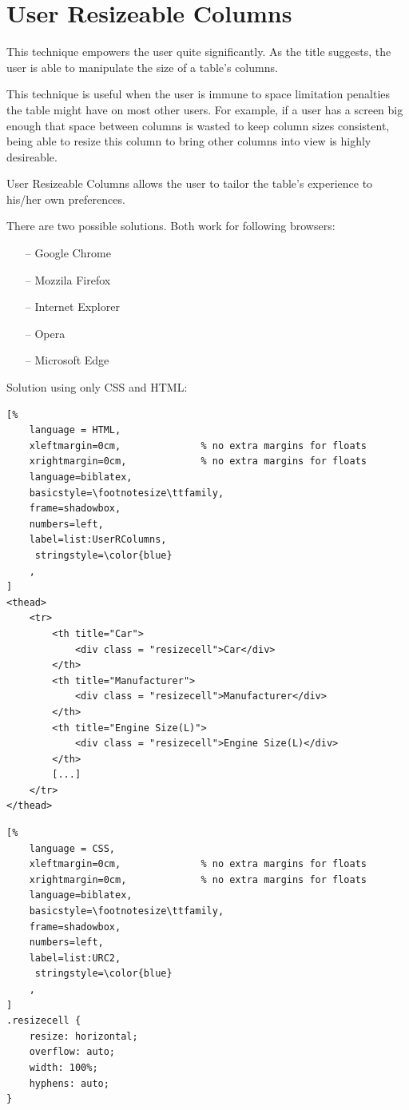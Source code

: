 \section{User Resizeable Columns}
This technique empowers the user quite significantly. As the title suggests, the user is able to manipulate the size of a table's columns. 

This technique is useful when the user is immune to space limitation penalties the table might have on most other users. For example, if a user has a screen big enough that space between columns is wasted to keep column sizes consistent, being able to resize this column to bring other columns into view is highly desireable.

User Resizeable Columns allows the user to tailor the table's experience to his/her own preferences. 

There are two possible solutions. Both work for following browsers:
\begin{itemize}
    \item[--] Google Chrome
    \item[--] Mozzila Firefox
    \item[--] Internet Explorer
    \item[--] Opera
    \item[--] Microsoft Edge
\end{itemize}

Solution using only CSS and HTML:
\begin{lstlisting}[%
    language = HTML,
    xleftmargin=0cm,              % no extra margins for floats
    xrightmargin=0cm,             % no extra margins for floats
    language=biblatex,
    basicstyle=\footnotesize\ttfamily,
    frame=shadowbox,
    numbers=left,
    label=list:UserRColumns,
     stringstyle=\color{blue}
    ,
]
<thead>
    <tr>
        <th title="Car">
            <div class = "resizecell">Car</div>
        </th>
        <th title="Manufacturer">
            <div class = "resizecell">Manufacturer</div>
        </th>
        <th title="Engine Size(L)">
            <div class = "resizecell">Engine Size(L)</div>
        </th>
        [...]
    </tr>
</thead>
\end{lstlisting}

\begin{lstlisting}[%
    language = CSS,
    xleftmargin=0cm,              % no extra margins for floats
    xrightmargin=0cm,             % no extra margins for floats
    language=biblatex,
    basicstyle=\footnotesize\ttfamily,
    frame=shadowbox,
    numbers=left,
    label=list:URC2,
     stringstyle=\color{blue}
    ,
]
.resizecell {
    resize: horizontal;
    overflow: auto;
    width: 100%;
    hyphens: auto;
}
\end{lstlisting}

